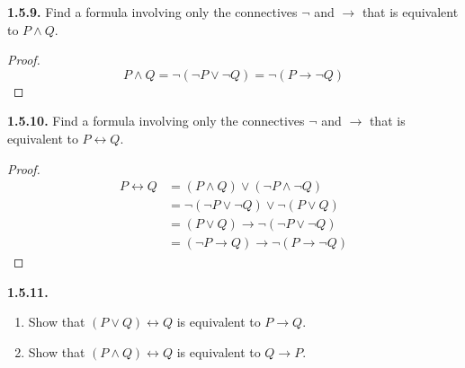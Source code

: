 \documentclass[12pt]{amsart}
\newenvironment{statement}[1]{\smallskip\noindent\color[rgb]{.6627, .3529, .6314} {\bf #1.}}{}
\theoremstyle{definition}
\theoremstyle{remark}
\begin{document}
\begin{statement}{1.5.9}
Find a formula involving only the connectives $\neg$ and $\rightarrow$ that is equivalent to $P \wedge Q$.
\end{statement}

\begin{proof}
\begin{equation*}
	P \wedge Q
	= \neg (\neg P \vee \neg Q)
	= \neg (P \rightarrow \neg Q)
\end{equation*}
\end{proof}


\begin{statement}{1.5.10}
Find a formula involving only the connectives $\neg$ and $\rightarrow$ that is equivalent to 
\newline
$P \leftrightarrow Q$.
\end{statement}

\begin{proof}
\begin{align*}
	P \leftrightarrow Q
	&= (P \wedge Q) \vee (\neg P \wedge \neg Q) \\
	&= \neg (\neg P \vee \neg Q) \vee \neg (P \vee Q) \\
	&= (P \vee Q) \rightarrow \neg (\neg P \vee \neg Q) \\
	&= (\neg P \rightarrow Q) \rightarrow \neg (P \rightarrow \neg Q)
\end{align*}
\end{proof}


\begin{statement}{1.5.11}
\begin{enumerate}
	\item Show that $(P \vee Q) \leftrightarrow Q$ is equivalent to $P \rightarrow Q$.
	\item Show that $(P \wedge Q) \leftrightarrow Q$ is equivalent to $Q \rightarrow P$.
\end{enumerate}
\end{statement}
\end{document}

